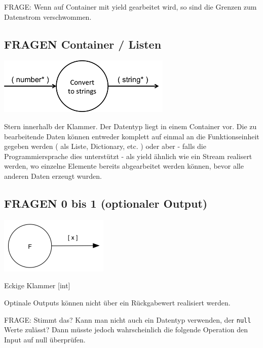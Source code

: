 \documentclass[11pt]{article}
\begin{document}
FRAGE: Wenn auf Container mit yield gearbeitet wird, so sind die Grenzen zum
Datenstrom verschwommen.
\subsection{{\bfseries\sffamily FRAGEN} Container / Listen}
\label{sec:orgheadline18}

\includegraphics[width=.9\linewidth]{./img/diagramCollection.png}

Stern innerhalb der Klammer.
Der Datentyp liegt in einem Container vor. 
Die zu bearbeitende Daten können entweder komplett auf einmal an die Funktionseinheit gegeben werden ( als Liste, Dictionary, etc. )
oder aber - falls die Programmiersprache dies unterstützt - als yield ähnlich
wie ein Stream realisert werden, wo einzelne Elemente bereits abgearbeitet werden
können, bevor alle anderen Daten erzeugt wurden.

\subsection{{\bfseries\sffamily FRAGEN} 0 bis 1 (optionaler Output)}
\label{sec:orgheadline19}

\includegraphics[width=.9\linewidth]{./img/diagramOptional.png}

Eckige Klammer
[int]

Optinale Outputs können nicht über ein Rückgabewert realisiert werden.

FRAGE: Stimmt das? Kann man nicht auch ein Datentyp verwenden, der \texttt{null} Werte zulässt?
Dann müsste jedoch wahrscheinlich die folgende Operation den Input auf null überprüfen.
\end{document}
